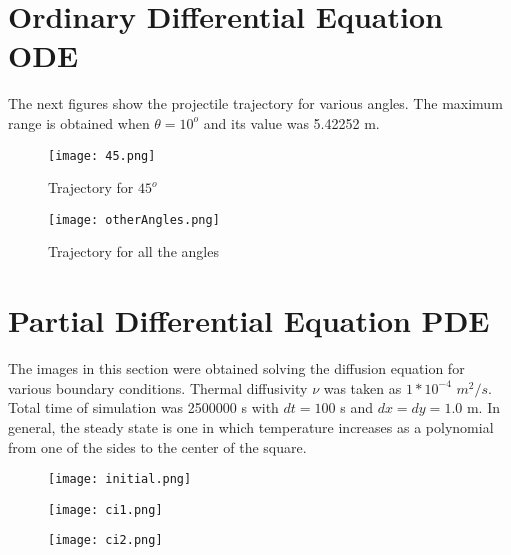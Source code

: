 \documentclass[]{article}
\begin{document}
\section{Ordinary Differential Equation ODE}

The next figures show the projectile trajectory for various angles. The maximum range is obtained when $\theta = 10^o$ and its value was 5.42252 m.

\begin{figure}[!h]{
	\begin{center}
	\texttt{[image: 45.png]}
	\caption{Trajectory for $45^o$}
	\end{center}
}\end{figure}

\begin{figure}[!h]{
	\begin{center}
	\texttt{[image: otherAngles.png]}
	\caption{Trajectory for all the angles}
	\end{center}
}\end{figure}

\section{Partial Differential Equation PDE}
The images in this section were obtained solving the diffusion equation for various boundary conditions. Thermal diffusivity $\nu$ was taken as $1*10^{-4}$ $m^2/s$. Total time of simulation was 2500000 s with $dt = 100$ s and $dx=dy=1.0$ m. In general, the steady state is one in which temperature increases as a polynomial from one of the sides to the center of the square.

\begin{figure}[!htb]{
	\begin{center}
	\texttt{[image: initial.png]}
	\end{center}
}\end{figure}


	\begin{figure}[!htb]{
		\begin{center}
		\texttt{[image: ci1.png]}
		\end{center}
	}\end{figure}

	\begin{figure}[!htb]{
		\begin{center}
		\texttt{[image: ci2.png]}
		\end{center}
	}\end{figure}
	
\end{document}
